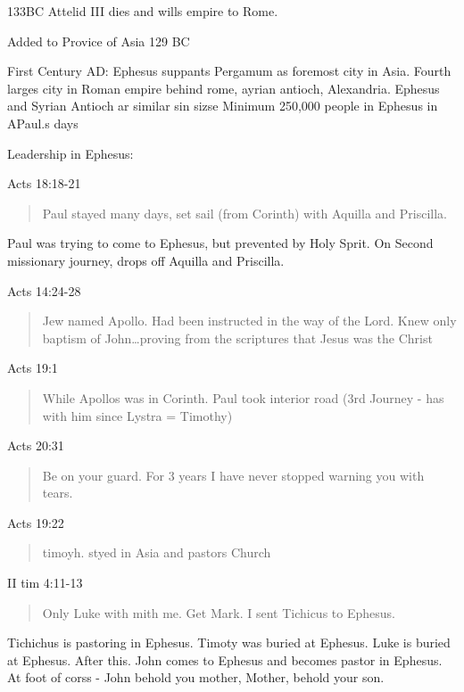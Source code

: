 \documentclass[
]{book}
\begin{document}
133BC Attelid III dies and wills empire to Rome.

Added to Provice of Asia 129 BC

First Century AD: Ephesus suppants Pergamum as foremost city in Asia. Fourth larges city in Roman empire behind rome, ayrian antioch, Alexandria. Ephesus and Syrian Antioch ar similar sin sizse Minimum 250,000 people in Ephesus in APaul.s days

Leadership in Ephesus:

Acts 18:18-21

\begin{quote}
Paul stayed many days, set sail (from Corinth) with Aquilla and Priscilla.
\end{quote}

Paul was trying to come to Ephesus, but prevented by Holy Sprit. On Second missionary journey, drops off Aquilla and Priscilla.

Acts 14:24-28

\begin{quote}
Jew named Apollo. Had been instructed in the way of the Lord. Knew only baptism of John\ldots proving from the scriptures that Jesus was the Christ
\end{quote}

Acts 19:1

\begin{quote}
While Apollos was in Corinth. Paul took interior road (3rd Journey - has with him since Lystra = Timothy)
\end{quote}

Acts 20:31

\begin{quote}
Be on your guard. For 3 years I have never stopped warning you with tears.
\end{quote}

Acts 19:22

\begin{quote}
timoyh. styed in Asia and pastors Church
\end{quote}

II tim 4:11-13

\begin{quote}
Only Luke with mith me. Get Mark. I sent Tichicus to Ephesus.
\end{quote}

Tichichus is pastoring in Ephesus. Timoty was buried at Ephesus. Luke is buried at Ephesus. After this. John comes to Ephesus and becomes pastor in Ephesus. At foot of corss - John behold you mother, Mother, behold your son.
\end{document}
